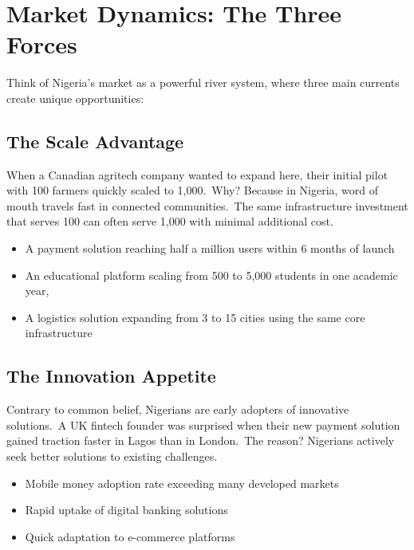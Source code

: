 \section{Market Dynamics: The Three Forces}\label{sec:market-dynamics:-the-three-forces}

Think of Nigeria's market as a powerful river system, where three main currents create unique opportunities:

\subsection{The Scale Advantage}\label{subsec:the-scale-advantage}
When a Canadian agritech company wanted to expand here, their initial pilot with 100 farmers quickly scaled to 1,000.\ Why?
Because in Nigeria, word of mouth travels fast in connected communities.\ The same infrastructure investment that serves 100 can often serve 1,000 with minimal additional cost.

\begin{tcolorbox}[colback=white,colframe=primarydark,title=\textbf{Scale Impact Examples}]
\begin{itemize}
    \item A payment solution reaching half a million users within 6 months of launch
    \item An educational platform scaling from 500 to 5,000 students in one academic year,
    \item A logistics solution expanding from 3 to 15 cities using the same core infrastructure
\end{itemize}
\end{tcolorbox}

\subsection{The Innovation Appetite}\label{subsec:the-innovation-appetite}
Contrary to common belief, Nigerians are early adopters of innovative solutions.\ A UK fintech founder was surprised when their new payment solution gained traction faster in Lagos than in London.\ The reason?
Nigerians actively seek better solutions to existing challenges.

\begin{tcolorbox}[colback=white,colframe=primary,title=\textbf{Innovation Adoption Examples}]
\begin{itemize}
    \item Mobile money adoption rate exceeding many developed markets
    \item Rapid uptake of digital banking solutions
    \item Quick adaptation to e-commerce platforms
\end{itemize}
\end{tcolorbox}

